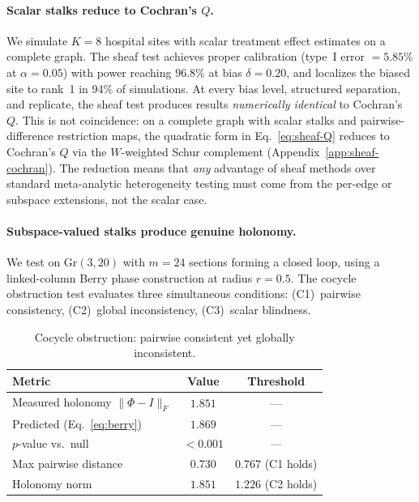 \documentclass{article}
\newcommand{\Gr}{\mathrm{Gr}}
\begin{document}
\paragraph{Scalar stalks reduce to Cochran's $Q$.}
We simulate $K = 8$ hospital sites with scalar treatment effect estimates on a complete graph.
The sheaf test achieves proper calibration (type~I error $= 5.85\%$ at $\alpha = 0.05$) with power reaching $96.8\%$ at bias $\delta = 0.20$, and localizes the biased site to rank~1 in 94\% of simulations.
At every bias level, structured separation, and replicate, the sheaf test produces results \emph{numerically identical} to Cochran's $Q$.
This is not coincidence: on a complete graph with scalar stalks and pairwise-difference restriction maps, the quadratic form in Eq.~\eqref{eq:sheaf-Q} reduces to Cochran's $Q$ via the $W$-weighted Schur complement (Appendix~\ref{app:sheaf-cochran}).
The reduction means that \emph{any} advantage of sheaf methods over standard meta-analytic heterogeneity testing must come from the per-edge or subspace extensions, not the scalar case.

\paragraph{Subspace-valued stalks produce genuine holonomy.}
We test on $\Gr(3, 20)$ with $m = 24$ sections forming a closed loop, using a linked-column Berry phase construction at radius $r = 0.5$.
The cocycle obstruction test evaluates three simultaneous conditions: (C1)~pairwise consistency, (C2)~global inconsistency, (C3)~scalar blindness.

\begin{table}[t]
\centering
\caption{Cocycle obstruction: pairwise consistent yet globally inconsistent.}
\label{tab:cocycle}
\small
\begin{tabular}{@{}lcc@{}}
\toprule
\textbf{Metric} & \textbf{Value} & \textbf{Threshold} \\
\midrule
Measured holonomy $\|\Phi - I\|_F$ & $1.851$ & --- \\
Predicted (Eq.~\ref{eq:berry}) & $1.869$ & --- \\
$p$-value vs.\ null & $< 0.001$ & --- \\
\midrule
Max pairwise distance & $0.730$ & $0.767$ (C1 holds) \\
Holonomy norm & $1.851$ & $1.226$ (C2 holds) \\
\bottomrule
\end{tabular}
\end{table}
\end{document}
